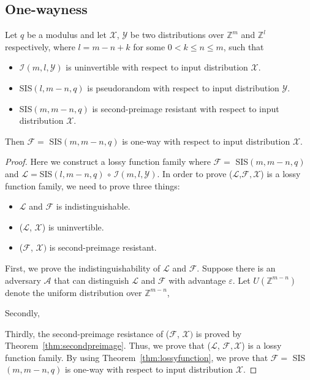 \documentclass[a4paper]{article}
\theoremstyle{definition}
\theoremstyle{remark}
\renewcommand{\epsilon}{\varepsilon}
\begin{document}
\subsection{One-wayness}
\begin{theorem}
  Let $q$ be a modulus and let $\mathcal{X}$, $\mathcal{Y}$ be two distributions over $\mathbb{Z}^{m}$ and  $\mathbb{Z}^{l}$
respectively, where $l = m - n + k$ for some $0 < k \le n \le m$, such that 
\begin{itemize}
  \item $\mathcal{I}(m, l, \mathcal{Y})$ is uninvertible with respect to input distribution $\mathcal{X}$.
  \item SIS$(l, m - n, q)$ is pseudorandom with respect to input distribution $\mathcal{Y}$.
  \item SIS$(m, m - n, q)$ is second-preimage resistant with respect to input distribution $\mathcal{X}$.
\end{itemize}
Then $\mathcal{F} = $ SIS$(m, m - n, q)$ is one-way with respect to input distribution $\mathcal{X}$. 
\end{theorem}
\begin{proof}
  Here we construct a lossy function family where $\mathcal{F} = $ SIS$(m, m - n, q)$ and 
  $\mathcal{L} = $SIS$(l, m - n, q)$ $\circ$ $\mathcal{I}(m, l, \mathcal{Y})$. 
  In order to prove ($\mathcal{L}$,$\mathcal{F},\mathcal{X}$) is a lossy function family, we need to prove three things:
  \begin{itemize}
    \item $\mathcal{L}$ and $\mathcal{F}$ is indistinguishable.
    \item ($\mathcal{L}$, $\mathcal{X}$) is uninvertible.
    \item ($\mathcal{F}$, $\mathcal{X})$ is second-preimage resistant.
  \end{itemize}
First, we prove the indistinguishability of $\mathcal{L}$ and $\mathcal{F}$.
Suppose there is an adversary $\mathcal{A}$ that can distinguish $\mathcal{L}$ and $\mathcal{F}$ with advantage $\epsilon$.
Let $U(\mathbb{Z}^{m - n})$ denote the uniform distribution over $\mathbb{Z}^{m - n}$, 

Secondly, 

Thirdly, the second-preimage resistance of ($\mathcal{F}$, $\mathcal{X})$ is proved by 
Theorem~\ref{thm:secondpreimage}.
Thus, we prove that ($\mathcal{L}$, $\mathcal{F}, \mathcal{X}$) is a lossy function family.
By using Theorem~\ref{thm:lossyfunction}, we prove that 
$\mathcal{F} = $ SIS$(m, m - n, q)$ is one-way with respect to input distribution $\mathcal{X}$. 
\end{proof}
\end{document}

